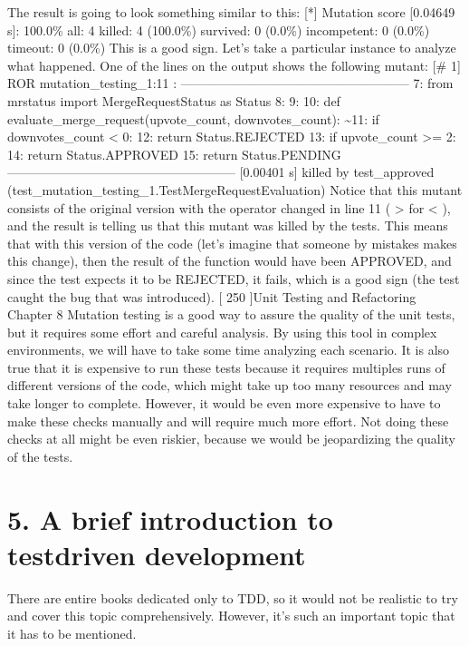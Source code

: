 \documentclass[a4paper,10pt,english]{sphinxmanual}
\begin{document}
The result is going to look something similar to this:
{[}*{]} Mutation score {[}0.04649 s{]}: 100.0\%
\sphinxhyphen{} all: 4
\sphinxhyphen{} killed: 4 (100.0\%)
\sphinxhyphen{} survived: 0 (0.0\%)
\sphinxhyphen{} incompetent: 0 (0.0\%)
\sphinxhyphen{} timeout: 0 (0.0\%)
This is a good sign. Let’s take a particular instance to analyze what happened. One of the
lines on the output shows the following mutant:
\sphinxhyphen{} {[}\# 1{]} ROR mutation\_testing\_1:11 :
——————————————————
7: from mrstatus import MergeRequestStatus as Status
8:
9:
10: def evaluate\_merge\_request(upvote\_count, downvotes\_count):
\textasciitilde{}11:
if downvotes\_count \textless{} 0:
12:
return Status.REJECTED
13:
if upvote\_count \textgreater{}= 2:
14:
return Status.APPROVED
15:
return Status.PENDING
——————————————————
{[}0.00401 s{]} killed by test\_approved
(test\_mutation\_testing\_1.TestMergeRequestEvaluation)
Notice that this mutant consists of the original version with the operator changed in line 11
( \textgreater{} for \textless{} ), and the result is telling us that this mutant was killed by the tests. This means that
with this version of the code (let’s imagine that someone by mistakes makes this change),
then the result of the function would have been APPROVED, and since the test expects it to
be REJECTED, it fails, which is a good sign (the test caught the bug that was introduced).
{[} 250 {]}Unit Testing and Refactoring
Chapter 8
Mutation testing is a good way to assure the quality of the unit tests, but it requires some
effort and careful analysis. By using this tool in complex environments, we will have to take
some time analyzing each scenario. It is also true that it is expensive to run these tests
because it requires multiples runs of different versions of the code, which might take up too
many resources and may take longer to complete. However, it would be even more
expensive to have to make these checks manually and will require much more effort. Not
doing these checks at all might be even riskier, because we would be jeopardizing the
quality of the tests.


\section{5. A brief introduction to test\sphinxhyphen{}driven development}
\label{\detokenize{chapters/8_unit_testing/index:a-brief-introduction-to-test-driven-development}}
There are entire books dedicated only to TDD, so it would not be realistic to try and cover
this topic comprehensively. However, it’s such an important topic that it has to
be mentioned.
\end{document}
